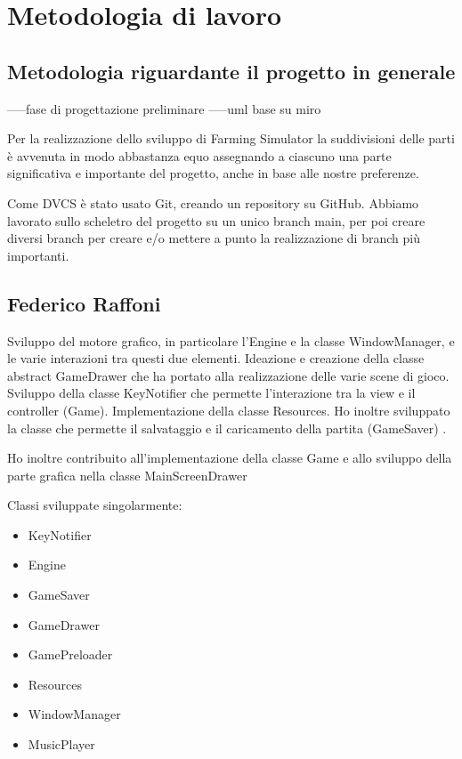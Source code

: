 \documentclass[a4paper,12pt]{report}
\begin{document}
\section{Metodologia di lavoro}

\subsection{Metodologia riguardante il progetto in generale}

-----fase di progettazione preliminare
-----uml base su miro

Per la realizzazione dello sviluppo di Farming Simulator la suddivisioni delle parti è avvenuta in modo abbastanza equo assegnando a ciascuno una parte significativa e importante del progetto, anche in base alle nostre preferenze. 

Come DVCS è stato usato Git, creando un repository su GitHub. Abbiamo lavorato sullo scheletro del progetto su un unico branch main, per poi creare diversi branch per creare e/o mettere a punto la realizzazione di branch più importanti.

\subsection{Federico Raffoni}
Sviluppo del motore grafico, in particolare l’Engine e la classe WindowManager, e le varie interazioni tra questi due elementi. Ideazione e creazione della classe abstract GameDrawer che ha portato alla realizzazione delle varie scene di gioco.  Sviluppo della classe KeyNotifier che permette l’interazione tra la view e il controller (Game). Implementazione della classe Resources. Ho inoltre sviluppato la classe che permette il salvataggio e il caricamento della partita (GameSaver) .

\hfill\break
Ho inoltre contribuito all'implementazione della classe Game  e  allo sviluppo della parte grafica nella classe MainScreenDrawer 

\hfill\break
Classi sviluppate singolarmente:
{
\begin{itemize}
	\item KeyNotifier
	\item Engine
	\item GameSaver
	\item GameDrawer
	\item GamePreloader
	\item Resources
	\item WindowManager
	\item MusicPlayer
\end{itemize}
}
\end{document}
